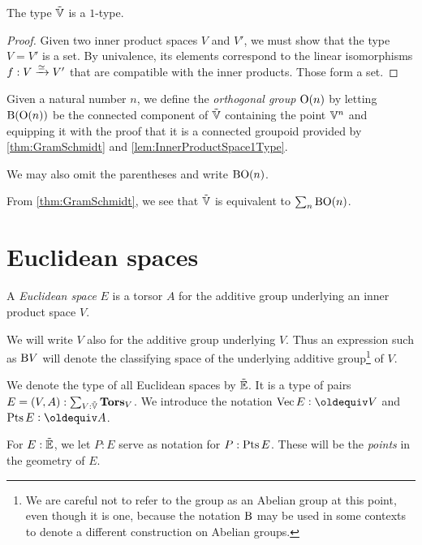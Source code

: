 \begin{lemma}\label{lem:InnerProductSpace1Type}
  The type ${\tilde {\mathbb V}}$ is a $1$-type.
\end{lemma}

\begin{proof}
  Given two inner product spaces $V$ and $V'$, we must show that the type
  $V=V'$ is a set.  By univalence, its elements correspond to the linear
  isomorphisms $f : V \xrightarrow {\simeq} V'$ that are compatible with the
  inner products.  Those form a set.
\end{proof}

\begin{definition}\label{def:OrthogonalGroup}
  Given a natural number $n$, we define the {\em orthogonal group} $\mathrm O(n)$
  by letting $\mathrm B (\mathrm O(n))$ be the connected component of ${\tilde {\mathbb V}}$ containing
  the point $\mathbb V^n$ and equipping it with the proof that it is a connected
  groupoid provided by \cref{thm:GramSchmidt} and
  \cref{lem:InnerProductSpace1Type}.
\end{definition}

We may also omit the parentheses and write $\mathrm B\mathrm O(n)$.

From \cref{thm:GramSchmidt}, we see that ${\tilde {\mathbb V}}$ is equivalent to 
$\sum_n \mathrm B \mathrm O(n)$.

\section{Euclidean spaces}

\begin{definition}\label{def:EuclideanSpace}
  A {\em Euclidean space} $E$ is a torsor $A$ for the additive group
  underlying an inner product space $V$.
\end{definition}

We will write $V$ also for the additive group underlying $V$.  Thus an
expression such as $\mathrm B V$ will denote the classifying space of the underlying
additive group\footnote{We are careful not to refer to the group as an Abelian
  group at this point, even though it is one, because the notation $\mathrm B$ may be
  used in some contexts to denote a different construction on Abelian groups.}
of $V$.

We denote the type of all Euclidean spaces by ${\tilde {\mathbb E}}$.  It is a type of pairs
$E = (V,A) : \sum_{V:{\tilde {\mathbb V}}} \mathbf{Tors}_V$.  We introduce the notation
$\Vectors E \defeq V$ and $\Points E \defeq A$.

For $E:{\tilde {\mathbb E}}$, we let $P:E$ serve as notation for $P:\operatorname{Pts} E$.  These will be
the {\em points} in the geometry of $E$.


